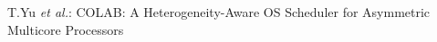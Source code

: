 \documentclass[10pt,journal,compsoc]{IEEEtran}
\begin{document}
% 
%



\markboth{}%
{T.Yu \MakeLowercase{\textit{et al.}}: COLAB: A Heterogeneity-Aware OS Scheduler for Asymmetric Multicore Processors}
% 



\end{document}
